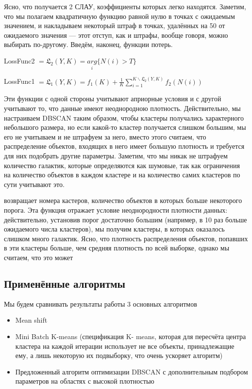 \documentclass[12pt,fleqn]{article}
\begin{document}
Ясно, что получается 2 СЛАУ, коэффициенты которых легко находятся. Заметим, что мы полагаем квадратичную функцию равной нулю в точках с ожидаемым значением, и накладываем некоторый штраф в точках, удалённых на 50 от ожидаемого значения --- этот отступ, как и штрафы, вообще говоря, можно выбирать по-другому. Введём, наконец, функции потерь.

LossFunc2 $=\mathfrak{L}_2(Y, K) = \underset{i}{arg}\{N(i)>T\}$ 

LossFunc1 $= \mathfrak{L}_1(Y, K) = f_1(K) + \frac{1}{K} \sum_{i=1}^{K \backslash \mathfrak{L}_2(Y, K)}f_2(N(i))$

Эти функции с одной стороны учитывают априорные условия и с другой учитывают то, что данные имеют неоднородною плотность. Действительно, мы настраиваем DBSCAN таким образом, чтобы кластеры получались характерного небольшого размера, но если какой-то кластер получается слишком большим, мы его не учитываем и не штрафуем за него, вместо этого считаем, что распределение объектов, входящих в него имеет большую плотность и требуется для них подобрать другие параметры. Заметим, что мы никак не штрафуем количество галактик, которые определяются как шумовые, так как ограничения на количество объектов в каждом кластере и на количество самих кластеров по сути учитывают это.


возвращает номера кастеров, количество объектов в которых больше некоторого порога. Эта функция отражает условие неоднородности плотности данных: действительно, установив порог достаточно большим (например, в 10 раз больше ожидаемого числа кластеров), мы получим кластеры, в которых оказалось слишком много галактик. Ясно, что плотность распределения объектов, попавших в эти кластеры больше, чем средняя плотность по всей выборке, однако мы считаем, что это может



\subsection{Применённые алгоритмы}

Мы будем сравнивать результаты работы 3 основных алгоритмов
\begin{itemize}
    \item
        Mean shift
    \item
        Mini Batch K-means (спецификация K- means, которая для пересчёта центра кластера на каждой итерации использует не все объекты, принадлежащие ему, а лишь некоторую их подвыборку, что очень ускоряет алгоритм)
    \item
        Предложенный алгоритм оптимизации DBSCAN с дополнительным подбором параметров на областях с высокой плотностью
\end{itemize}
\end{document}
